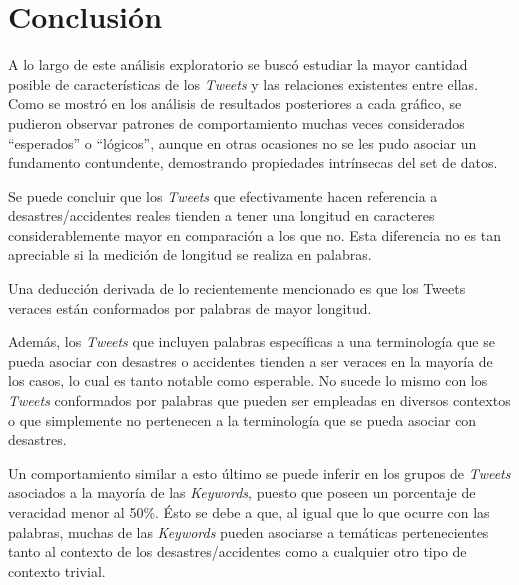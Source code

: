 \documentclass[titlepage,a4paper]{article}
\begin{document}
    \newpage
    \section{Conclusión}\label{sec:intro}

    A lo largo de este análisis exploratorio se buscó estudiar la mayor cantidad posible de características de los \textit{Tweets} y las relaciones existentes entre ellas. Como se mostró en los análisis de resultados posteriores a cada gráfico, se pudieron observar patrones de comportamiento muchas veces considerados ``esperados'' o ``lógicos'', aunque en otras ocasiones no se les pudo asociar un fundamento contundente, demostrando propiedades intrínsecas del set de datos.
    
    Se puede concluir que los \textit{Tweets} que efectivamente hacen referencia a desastres/accidentes reales tienden a tener una longitud en caracteres considerablemente mayor en comparación a los que no. Esta diferencia no es tan apreciable si la medición de longitud se realiza en palabras. 
    
    Una deducción derivada de lo recientemente mencionado es que los Tweets veraces están conformados por palabras de mayor longitud.    
    
    Además, los \textit{Tweets}  que incluyen palabras específicas a una terminología que se pueda asociar con desastres o accidentes tienden a ser veraces en la mayoría de los casos, lo cual es tanto notable como esperable. No sucede lo mismo con los \textit{Tweets} conformados por palabras que pueden ser empleadas en diversos contextos o que simplemente no pertenecen a la terminología que se pueda asociar con desastres.
    
    
    
    
    Un comportamiento similar a esto último se puede inferir en los grupos de \textit{Tweets} asociados a la mayoría de las \textit{Keywords}, puesto que poseen un porcentaje de veracidad menor al 50\%. Ésto se debe a que, al igual que lo que ocurre con las palabras, muchas de las \textit{Keywords} pueden asociarse a temáticas pertenecientes tanto al contexto de los desastres/accidentes como a cualquier otro tipo de contexto trivial.
    
\end{document}
